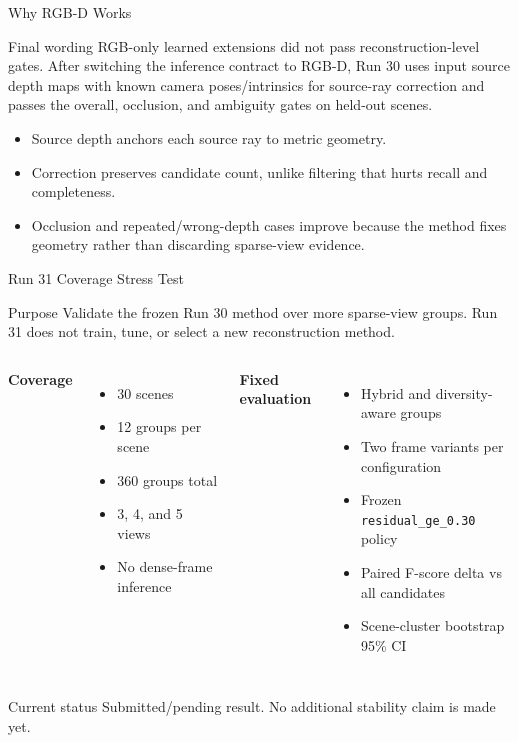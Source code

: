 \begin{frame}{Why RGB-D Works}
  \footnotesize
  \begin{alertblock}{Final wording}
    RGB-only learned extensions did not pass reconstruction-level gates. After
    switching the inference contract to RGB-D, Run 30 uses input source depth
    maps with known camera poses/intrinsics for source-ray correction and passes
    the overall, occlusion, and ambiguity gates on held-out scenes.
  \end{alertblock}

  \begin{itemize}
    \item Source depth anchors each source ray to metric geometry.
    \item Correction preserves candidate count, unlike filtering that hurts
    recall and completeness.
    \item Occlusion and repeated/wrong-depth cases improve because the method
    fixes geometry rather than discarding sparse-view evidence.
  \end{itemize}
\end{frame}

\begin{frame}{Run 31 Coverage Stress Test}
  \small
  \begin{block}{Purpose}
    Validate the frozen Run 30 method over more sparse-view groups. Run 31 does
    not train, tune, or select a new reconstruction method.
  \end{block}

  \begin{columns}[T]
    \textbf{Coverage}
    \begin{itemize}
      \item 30 scenes
      \item 12 groups per scene
      \item 360 groups total
      \item 3, 4, and 5 views
      \item No dense-frame inference
    \end{itemize}

    \textbf{Fixed evaluation}
    \begin{itemize}
      \item Hybrid and diversity-aware groups
      \item Two frame variants per configuration
      \item Frozen \texttt{residual\_ge\_0.30} policy
      \item Paired F-score delta vs all candidates
      \item Scene-cluster bootstrap 95\% CI
    \end{itemize}
  \end{columns}

  \vspace{0.08cm}
  \begin{alertblock}{Current status}
    Submitted/pending result. No additional stability claim is made yet.
  \end{alertblock}
\end{frame}

